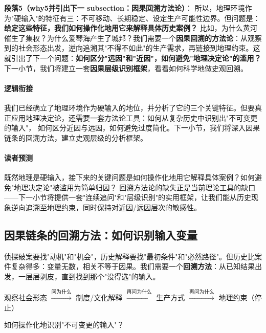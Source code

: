 \documentclass[../main.tex]{subfiles}
\begin{document}
	\textbf{段落5（why5并引出下一 subsection：因果回溯方法论）}：  
	所以，地理环境作为"硬输入"的特征有三：不可移动、长期稳定、设定生产可能性边界。但问题是：\textbf{给定这些特征，我们如何操作化地用它来解释具体历史案例？} 比如，为什么黄河催生了集权？为什么爱琴海产生了城邦？我们需要一个\textbf{因果回溯的方法论}：从观察到的社会形态出发，逆向追溯其"不得不如此"的生产需求，再链接到地理约束。这就引出了下一个问题：\textbf{如何区分"远因"和"近因"，如何避免"地理决定论"的滥用？} 下一小节，我们将建立一套\textbf{因果层级识别框架}，看看如何科学地做史观回溯。
	
	\paragraph*{逻辑衔接}
		我们已经确立了地理环境作为硬输入的地位，并分析了它的三个关键特征。但要真正应用地理决定论，还需要一套方法论工具：如何从复杂历史中识别出"不可变更的输入"，
	如何区分近因与远因，如何避免过度简化。下一小节，我们将深入因果链条的回溯方法，建立史观层级的分析框架。

	\paragraph*{读者预测}
		既然地理是硬输入，接下来的关键问题是如何操作化地用它解释具体案例？如何避免"地理决定论"被滥用为简单归因？
	回溯方法论的缺失正是当前理论工具的缺口——下一小节将提供一套"连续追问"和"层级识别"的实用框架，让我们能从历史现象逆向追溯至地理约束，同时保持对近因/远因层次的敏感性。

	\subsection{因果链条的回溯方法：如何识别输入变量}
	
	\begin{motivation}
		侦探破案要找"动机"和"机会"，历史解释要找"最初条件"和"必然路径"。但历史比案件复杂得多：变量无数，相关不等于因果。我们需要一个\textbf{回溯方法}：从已知结果出发，一层层剥皮，直到找到那个"没得选"的输入。
	\end{motivation}
	
	\begin{logicmap}
		观察社会形态 $\xrightarrow{\text{问为什么}}$ 制度/文化解释 $\xrightarrow{\text{再问为什么}}$ 生产方式 $\xrightarrow{\text{再问为什么}}$ 地理约束（停止）
	\end{logicmap}
	
	\begin{questionbox}
		如何操作化地识别"不可变更的输入"？
	\end{questionbox}
	
\end{document}
